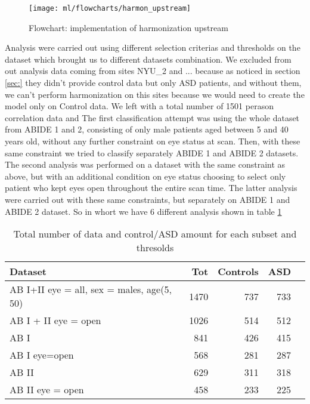 \documentclass[a4paper,11pt]{article}
\begin{document}
\begin{figure}[h!]
\centering
\texttt{[image: ml/flowcharts/harmon\_upstream]}
\caption{Flowchart: implementation of harmonization upstream}
\label{fig:harmon_upstream_flowchart}
\end{figure}



Analysis were carried out using different selection criterias and thresholds on the dataset which brought us to different datasets combination.
We excluded from out analysis data coming from sites NYU\_2 and ... because as noticed in section \ref{sec:} they didn't provide control data but only ASD patients, and without them, we can't perform harmonization on this sites because we would need to create the model only on Control data.
We left with a total number of 1501 perason correlation data and
The first classification attempt was using the whole dataset from ABIDE 1 and 2, consisting of only male patients aged between 5 and 40 years old, without any further constraint on eye status at scan.
Then, with these same constraint we tried to classify separately ABIDE 1 and ABIDE 2 datasets.
The second analysis was performed on a dataset with the same constraint as above, but with an additional condition on eye status choosing to select only patient who kept eyes open throughout the entire scan time.
The latter analysis were carried out with these same constraints, but separately on ABIDE 1 and ABIDE 2 dataset.
So in whort we have 6 different analysis shown in table \ref{tab:controlasd_per_subset}




\begin{table}[!htp]\centering
\scriptsize
\begin{tabular}{lrrrr}\toprule
Dataset &Tot &Controls &ASD \\\midrule
AB I+II eye = all, sex = males, age(5, 50) &1470 &737 &733 \\
AB I + II eye = open &1026 &514 &512 \\
AB I &841 &426 &415 \\
AB I eye=open &568 &281 &287 \\
AB II &629 &311 &318 \\
AB II eye = open &458 &233 &225 \\
\bottomrule
\end{tabular}
\caption{Total number of data and control/ASD amount for each subset and thresolds}
\label{tab:controlasd_per_subset}
\end{table}
\end{document}
